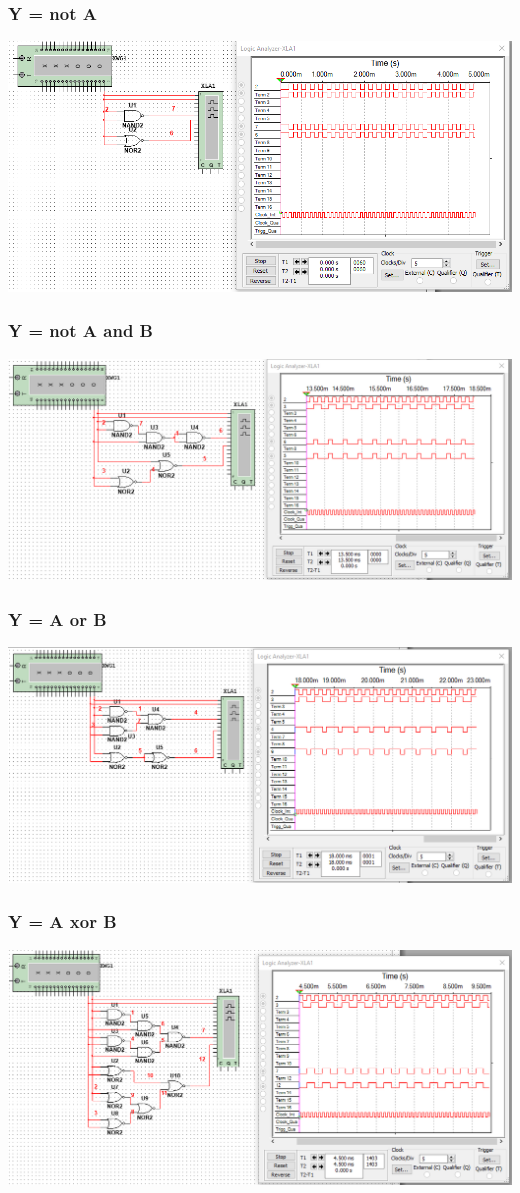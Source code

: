 \documentclass[12pt,a4paper]{article}
\begin{document}
\subsubsection{Y = not A}
\includegraphics[width=\textwidth]{logic_analyzer/not_a}

\subsubsection{Y = not A and B}
\includegraphics[width=\textwidth]{logic_analyzer/not_a_and_b}

\subsubsection{Y = A or B}
\includegraphics[width=\textwidth]{logic_analyzer/a_or_b}

\subsubsection{Y = A xor B}
\includegraphics[width=\textwidth]{logic_analyzer/a_xor_b}
\end{document}

